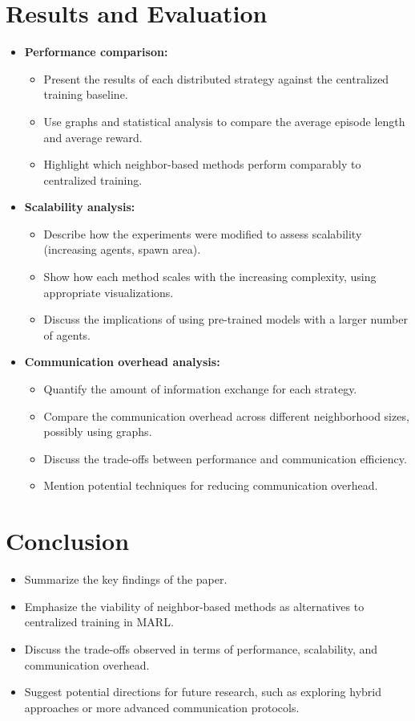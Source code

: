 \documentclass[sigconf]{acmart}
\begin{document}
\section{Results and Evaluation}\label{sec:results}
\begin{itemize}
\item \textbf{Performance comparison:}
\begin{itemize}
\item Present the results of each distributed strategy against the centralized training baseline.
\item Use graphs and statistical analysis to compare the average episode length and average reward.
\item Highlight which neighbor-based methods perform comparably to centralized training.
\end{itemize}
\item \textbf{Scalability analysis:}
\begin{itemize}
\item Describe how the experiments were modified to assess scalability (increasing agents, spawn area).
\item Show how each method scales with the increasing complexity, using appropriate visualizations.
\item Discuss the implications of using pre-trained models with a larger number of agents.
\end{itemize}
\item \textbf{Communication overhead analysis:}
\begin{itemize}
\item Quantify the amount of information exchange for each strategy.
\item Compare the communication overhead across different neighborhood sizes, possibly using graphs.
\item Discuss the trade-offs between performance and communication efficiency.
\item Mention potential techniques for reducing communication overhead.
\end{itemize}
\end{itemize}

\section{Conclusion}\label{sec:conclusion}
\begin{itemize}
\item Summarize the key findings of the paper.
\item Emphasize the viability of neighbor-based methods as alternatives to centralized training in MARL.
\item Discuss the trade-offs observed in terms of performance, scalability, and communication overhead.
\item Suggest potential directions for future research, such as exploring hybrid approaches or more advanced communication protocols.
\end{itemize}



 
\end{document}
